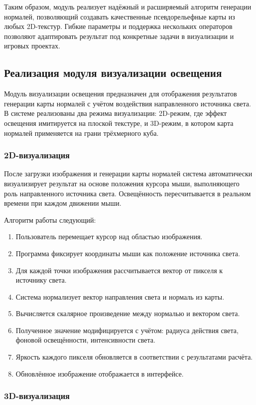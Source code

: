 Таким образом, модуль реализует надёжный и расширяемый алгоритм генерации нормалей, позволяющий создавать качественные псевдорельефные карты из любых 2D-текстур. Гибкие параметры и поддержка нескольких операторов позволяют адаптировать результат под конкретные задачи в визуализации и игровых проектах.
\subsection{Реализация модуля визуализации освещения}

Модуль визуализации освещения предназначен для отображения результатов генерации карты нормалей с учётом воздействия направленного источника света. В системе реализованы два режима визуализации: 2D-режим, где эффект освещения имитируется на плоской текстуре, и 3D-режим, в котором карта нормалей применяется на грани трёхмерного куба.
\subsubsection{2D-визуализация}

После загрузки изображения и генерации карты нормалей система автоматически визуализирует результат на основе положения курсора мыши, выполняющего роль направленного источника света. Освещённость пересчитывается в реальном времени при каждом движении мыши.

Алгоритм работы следующий:
\begin{enumerate}
	\item Пользователь перемещает курсор над областью изображения.
	\item Программа фиксирует координаты мыши как положение источника света.
	\item Для каждой точки изображения рассчитывается вектор от пикселя к источнику света.
	\item Система нормализует вектор направления света и нормаль из карты.
	\item Вычисляется скалярное произведение между нормалью и вектором света.
	\item Полученное значение модифицируется с учётом: радиуса действия света, фоновой освещённости, интенсивности света.
	\item Яркость каждого пикселя обновляется в соответствии с результатами расчёта.
	\item Обновлённое изображение отображается в интерфейсе.
\end{enumerate}
\subsubsection{3D-визуализация}

